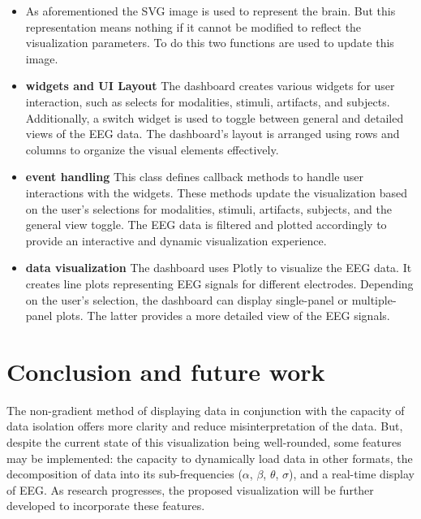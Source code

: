 \documentclass[format=sigconf]{acmart}
\begin{document}
			\begin{itemize}
				\item As aforementioned the SVG image is used to represent the brain. But this representation means nothing if it cannot be modified to reflect the visualization parameters. To do this two functions are used to update this image.
				
				
				
				
				\item{\textbf{widgets and UI Layout}} The dashboard creates various widgets for user interaction, such as selects for modalities, stimuli, artifacts, and subjects. Additionally, a switch widget is used to toggle between general and detailed views of the EEG data. The dashboard's layout is arranged using rows and columns to organize the visual elements effectively.
				
				\item{\textbf{event handling}} This class defines callback methods to handle user interactions with the widgets. These methods update the visualization based on the user's selections for modalities, stimuli, artifacts, subjects, and the general view toggle. The EEG data is filtered and plotted accordingly to provide an interactive and dynamic visualization experience.
				
				\item{\textbf{data visualization}} The dashboard uses Plotly to visualize the EEG data. It creates line plots representing EEG signals for different electrodes. Depending on the user's selection, the dashboard can display single-panel or multiple-panel plots. The latter provides a more detailed view of the EEG signals.
			\end{itemize}
	
	\section{Conclusion and future work}
		\par The non-gradient method of displaying data in conjunction with the capacity of data isolation offers more clarity and reduce misinterpretation of the data. But, despite the current state of this visualization being well-rounded, some features may be implemented: the capacity to dynamically load data in other formats, the decomposition of data into its sub-frequencies ($\alpha$, $\beta$, $\theta$, $\sigma$), and a real-time display of EEG. As research progresses, the proposed visualization will be further developed to incorporate these features. 
\end{document}
